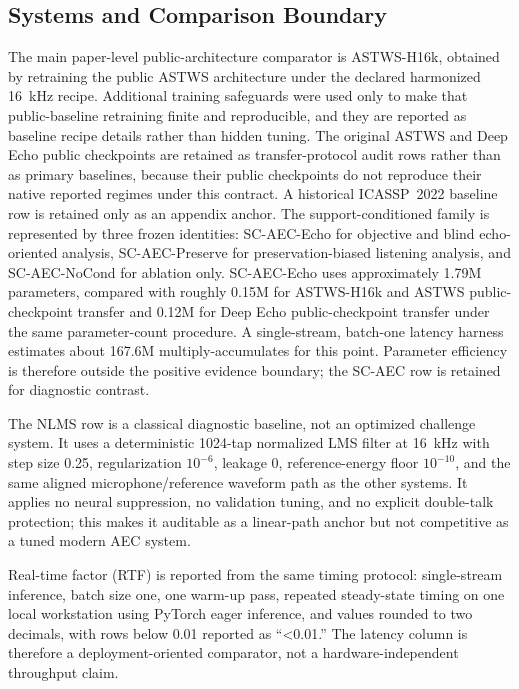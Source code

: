 \documentclass[journal]{IEEEtran}
\begin{document}
\subsection{Systems and Comparison Boundary}
The main paper-level public-architecture comparator is ASTWS-H16k, obtained by retraining the public ASTWS architecture under the declared harmonized 16~kHz recipe. Additional training safeguards were used only to make that public-baseline retraining finite and reproducible, and they are reported as baseline recipe details rather than hidden tuning. The original ASTWS and Deep Echo public checkpoints are retained as transfer-protocol audit rows rather than as primary baselines, because their public checkpoints do not reproduce their native reported regimes under this contract. A historical ICASSP~2022 baseline row is retained only as an appendix anchor. The support-conditioned family is represented by three frozen identities: SC-AEC-Echo for objective and blind echo-oriented analysis, SC-AEC-Preserve for preservation-biased listening analysis, and SC-AEC-NoCond for ablation only. SC-AEC-Echo uses approximately 1.79M parameters, compared with roughly 0.15M for ASTWS-H16k and ASTWS public-checkpoint transfer and 0.12M for Deep Echo public-checkpoint transfer under the same parameter-count procedure. A single-stream, batch-one latency harness estimates about 167.6M multiply-accumulates for this point. Parameter efficiency is therefore outside the positive evidence boundary; the SC-AEC row is retained for diagnostic contrast.

The NLMS row is a classical diagnostic baseline, not an optimized challenge system. It uses a deterministic 1024-tap normalized LMS filter at 16~kHz with step size 0.25, regularization $10^{-6}$, leakage 0, reference-energy floor $10^{-10}$, and the same aligned microphone/reference waveform path as the other systems. It applies no neural suppression, no validation tuning, and no explicit double-talk protection; this makes it auditable as a linear-path anchor but not competitive as a tuned modern AEC system.



Real-time factor (RTF) is reported from the same timing protocol: single-stream inference, batch size one, one warm-up pass, repeated steady-state timing on one local workstation using PyTorch eager inference, and values rounded to two decimals, with rows below 0.01 reported as ``<0.01.'' The latency column is therefore a deployment-oriented comparator, not a hardware-independent throughput claim.
\end{document}
